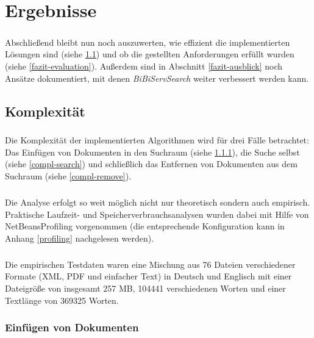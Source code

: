 
\chapter{Ergebnisse}
\label{fazit}

\paragraph{} Abschließend bleibt nun noch auszuwerten, wie effizient die implementierten Lösungen sind (siehe \ref{fazit-complexity}) und ob die gestellten Anforderungen erfüllt wurden (siehe \ref{fazit-evaluation}). Außerdem sind in Abschnitt \ref{fazit-ausblick} noch Ansätze dokumentiert, mit denen \textit{BiBiServSearch} weiter verbessert werden kann.

\section{Komplexität}
\label{fazit-complexity}

\paragraph{} Die Komplexität der implementierten Algorithmen wird für drei Fälle betrachtet: Das Einfügen von Dokumenten in den Suchraum (siehe \ref{compl-insert}), die Suche selbst (siehe \ref{compl-search}) und schließlich das Entfernen von Dokumenten aus dem Suchraum (siehe \ref{compl-remove}). %
\paragraph{} Die Analyse erfolgt so weit möglich nicht nur theoretisch sondern auch empirisch. Praktische Laufzeit- und Speicherverbrauchsanalysen wurden dabei mit Hilfe von NetBeans\texttrademark Profiling vorgenommen (die entsprechende Konfiguration kann in Anhang \ref{profiling} nachgelesen werden).
\paragraph{} Die empirischen Testdaten waren eine Mischung aus 76 Dateien verschiedener Formate (XML, PDF und einfacher Text) in Deutsch und Englisch mit einer Dateigröße von insgesamt 257 MB, 104441 verschiedenen Worten und einer Textlänge von 369325 Worten.

\subsection{Einfügen von Dokumenten}
\label{compl-insert}


